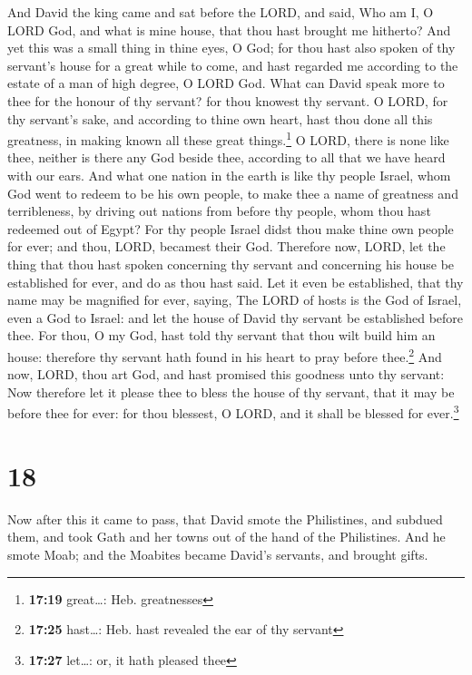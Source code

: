  And David the king came and sat before the LORD, and
said, Who am I, O LORD God, and what is mine house, that thou hast
brought me hitherto?  And yet this was a small thing in
thine eyes, O God; for thou hast also spoken of thy servant's house for
a great while to come, and hast regarded me according to the estate of a
man of high degree, O LORD God.  What can David speak
more to thee for the honour of thy servant? for thou knowest thy
servant.  O LORD, for thy servant's sake, and according
to thine own heart, hast thou done all this greatness, in making known
all these great things.\footnote{\textbf{17:19} great\ldots: Heb.
  greatnesses}  O LORD, there is none like thee, neither
is there any God beside thee, according to all that we have heard with
our ears.  And what one nation in the earth is like thy
people Israel, whom God went to redeem to be his own people, to make
thee a name of greatness and terribleness, by driving out nations from
before thy people, whom thou hast redeemed out of Egypt? 
For thy people Israel didst thou make thine own people for ever; and
thou, LORD, becamest their God.  Therefore now, LORD, let
the thing that thou hast spoken concerning thy servant and concerning
his house be established for ever, and do as thou hast said.
 Let it even be established, that thy name may be
magnified for ever, saying, The LORD of hosts is the God of Israel, even
a God to Israel: and let the house of David thy servant be established
before thee.  For thou, O my God, hast told thy servant
that thou wilt build him an house: therefore thy servant hath found in
his heart to pray before thee.\footnote{\textbf{17:25} hast\ldots: Heb.
  hast revealed the ear of thy servant}  And now, LORD,
thou art God, and hast promised this goodness unto thy servant:
 Now therefore let it please thee to bless the house of
thy servant, that it may be before thee for ever: for thou blessest, O
LORD, and it shall be blessed for ever.\footnote{\textbf{17:27}
  let\ldots: or, it hath pleased thee}

\hypertarget{section-17}{%
\section{18}\label{section-17}}

 Now after this it came to pass, that David smote the
Philistines, and subdued them, and took Gath and her towns out of the
hand of the Philistines.  And he smote Moab; and the
Moabites became David's servants, and brought gifts.

